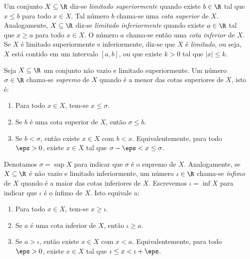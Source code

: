 \documentclass{article}
\begin{document}
\begin{defn}
    Um conjunto \(X \subseteq \R\) diz-se \emph{limitado superiormente} quando existe \(b \in \R\) tal que \(x \leq b\) para todo \(x \in X\). Tal número \(b\) chama-se uma \emph{cota superior} de \(X\). Analogamente, \(X \subseteq \R\) diz-se \emph{limitado inferiormente} quando existe \(a \in \R\) tal que \(x \geq a\) para todo \(x \in X\). O número \(a\) chama-se então uma \emph{cota inferior} de \(X\).
    Se \(X\) é limitado superiormente e inferiormente, diz-se que \(X\) é \emph{limitado}, ou seja, \(X\) está contido em um intervalo \([a,b]\), ou que existe \(k > 0\) tal que \(|x| \leq k\).
\end{defn}

\begin{defn} [supremo]
    Seja \(X \subseteq \R\) um conjunto não vazio e limitado superiormente. Um número \(\sigma \in \R\) chama-se \emph{supremo} de \(X\) quando é a menor das cotas superiores de \(X\), isto é:
    \begin{enumerate}
        \item [\textbf{S1}] Para todo \(x \in X\), tem-se \(x \leq \sigma\).
        \item [\textbf{S2}] Se \(b\) é uma cota superior de \(X\), então \(\sigma \leq b\).
        \item [\textbf{S2'}] Se \(b < \sigma\), então existe \(x \in X\) com \(b < x\). Equivalentemente, para todo \(\eps > 0\), existe \(x \in X\) tal que \(\sigma - \eps < x \leq \sigma\).
    \end{enumerate}

    Denotamos \(\sigma = \sup X\) para indicar que \(\sigma\) é o supremo de \(X\).
    Analogamente, se \(X \subseteq \R\) é não vazio e limitado inferiormente, um número \(\iota \in \R\) chama-se \emph{ínfimo} de \(X\) quando é a maior das cotas inferiores de \(X\). Escrevemos \(\iota = \inf X\) para indicar que \(\iota\) é o ínfimo de \(X\). Isto equivale a:
    \begin{enumerate}
        \item [\textbf{I1}] Para todo \(x \in X\), tem-se \(x \geq \iota\).
        \item [\textbf{I2}] Se \(a\) é uma cota inferior de \(X\), então \(\iota \geq a\).
        \item [\textbf{I2'}] Se \(a > \iota\), então existe \(x \in X\) com \(x < a\). Equivalentemente, para todo \(\eps > 0\), existe \(x \in X\) tal que \(\iota \leq x < \iota + \eps\).
    \end{enumerate}
\end{defn}
\end{document}
